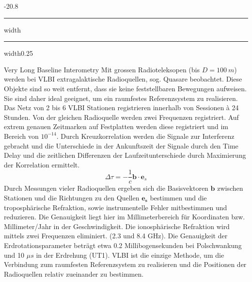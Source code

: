 \documentclass[8pt, landscape, fleqn]{scrartcl}
\makeatletter
\renewcommand{\subsection}{\@startsection{subsection}{1}{0mm}%
{-2\baselineskip}{0.8\baselineskip}%
{\hrule depth 0.2pt width\columnwidth\hrule depth0.75pt
width0.25\columnwidth\vspace*{1.2em}\large\bfseries\rmfamily}}
\makeatother
\begin{document}
\begin{multicols*}{3}
\subsection{Very Long Baseline Interometry}
Mit grossen Radioteleksopen (bis $D=100~m$) werden bei VLBI extragalaktische Radioquellen, sog. Quasare beobachtet. Diese Objekte sind so weit entfernt, dass sie keine feststellbaren Bewegungen aufweisen. Sie sind daher ideal geeignet, um ein raumfestes Referenzsystem zu realisieren. Das Netz von 2 bis 6 VLBI Stationen registrieren innerhalb von Sessionen à 24 Stunden. Von der gleichen Radioquelle werden zwei Frequenzen registriert. Auf extrem genauen Zeitmarken auf Festplatten werden diese registriert und im Bereich von $10^{-14}$. Durch Kreuzkorrelation werden die Signale zur Interferenz gebracht und die Unterschiede in der Ankunftszeit der Signale durch den Time Delay und die zeitlichen Differenzen der Laufzeitunterschiede durch Maximierung der Korrelation ermittelt. 
\begin{equation*}
    \Delta \tau = -\frac{1}{c}\mathbf{b}\cdot \mathbf{e}_s
\end{equation*}
Durch Messungen vieler Radioquellen ergeben sich die Basisvektoren $\mathbf{b}$ zwischen Stationen und die Richtungen zu den Quellen $\mathbf{e_s}$ bestimmen und die troposphärische Refraktion, sowie instrumentelle Fehler mitbestimmen und reduzieren. Die Genauigkeit liegt hier im Millimeterbereich für Koordinaten bzw. Millimeter/Jahr in der Geschwindigkeit. Die ionosphärische Refraktion wird mittels zwei Frequenzen eliminiert. (2.3 und 8.4 GHz). Die Genauigkeit der Erdrotationsparameter beträgt etwa 0.2 Millibogensekunden bei Polschwankung und 10 $\mu s$ in der Erdrehung (UT1). VLBI ist die einzige Methode, um die Verbindung zum raumfesten Referenzsystem zu realisieren und die Positionen der Radioquellen relativ zueinander zu bestimmen.


\end{multicols*}
\end{document}
